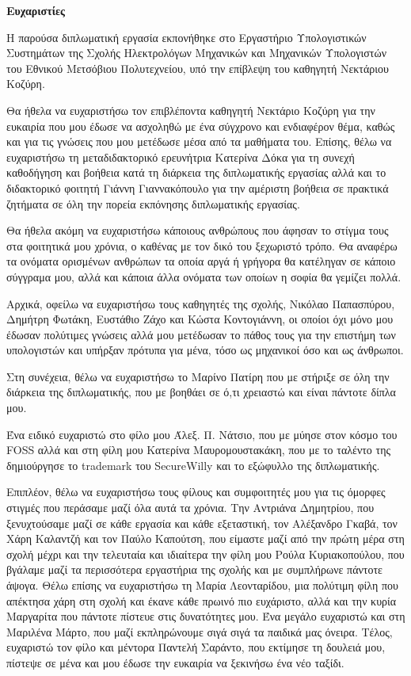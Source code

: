 \thispagestyle{empty}
\gr{}
\begingroup
 
\begin{mdseries}
\hfill\break 
\textbf{\Large Ευχαριστίες}
\hfill\break

Η παρούσα διπλωματική εργασία εκπονήθηκε στο Εργαστήριο Υπολογιστικών Συστημάτων της Σχολής Ηλεκτρολόγων Μηχανικών και Μηχανικών Υπολογιστών του Εθνικού Μετσόβιου Πολυτεχνείου, υπό την επίβλεψη του καθηγητή Νεκτάριου Κοζύρη.

Θα ήθελα να ευχαριστήσω τον επιβλέποντα καθηγητή Νεκτάριο Κοζύρη για την ευκαιρία που μου έδωσε να ασχοληθώ με ένα σύγχρονο και ενδιαφέρον θέμα, καθώς και για τις γνώσεις που μου μετέδωσε μέσα από τα μαθήματα του. Επίσης, θέλω να ευχαριστήσω τη μεταδιδακτορικό ερευνήτρια Κατερίνα Δόκα για τη συνεχή καθοδήγηση και βοήθεια κατά τη διάρκεια της διπλωματικής εργασίας αλλά και το διδακτορικό φοιτητή Γιάννη Γιαννακόπουλο για την αμέριστη βοήθεια σε πρακτικά ζητήματα σε όλη την πορεία εκπόνησης διπλωματικής εργασίας.

Θα ήθελα ακόμη να ευχαριστήσω κάποιους ανθρώπους που άφησαν το στίγμα τους στα φοιτητικά μου χρόνια, ο καθένας με τον δικό του ξεχωριστό τρόπο. Θα αναφέρω τα ονόματα ορισμένων ανθρώπων τα οποία αργά ή γρήγορα θα κατέληγαν σε κάποιο σύγγραμα μου, αλλά και κάποια άλλα ονόματα των οποίων η σοφία θα γεμίζει πολλά.

Αρχικά, οφείλω να ευχαριστήσω τους καθηγητές της σχολής, Νικόλαο Παπασπύρου, Δημήτρη Φωτάκη, Ευστάθιο Ζάχο και Κώστα Κοντογιάννη, οι οποίοι όχι μόνο μου έδωσαν πολύτιμες γνώσεις αλλά μου μετέδωσαν το πάθος τους για την επιστήμη των υπολογιστών και υπήρξαν πρότυπα για μένα, τόσο ως μηχανικοί όσο και ως άνθρωποι.

Στη συνέχεια, θέλω να ευχαριστήσω το Μαρίνο Πατίρη που με στήριξε σε όλη την διάρκεια της διπλωματικής, που με βοηθάει σε ό,τι χρειαστώ και είναι πάντοτε δίπλα μου.

Ένα ειδικό ευχαριστώ στο φίλο μου Άλεξ. Π. Νάτσιο, που με μύησε στον κόσμο του \en FOSS\gr{} αλλά και στη φίλη μου Κατερίνα Μαυρομουστακάκη, που με το ταλέντο της δημιούργησε το \en trademark\gr{} του \en SecureWilly\gr{} και το εξώφυλλο της διπλωματικής.

Επιπλέον, θέλω να ευχαριστήσω τους φίλους και συμφοιτητές μου για τις όμορφες στιγμές που περάσαμε μαζί όλα αυτά τα χρόνια. Την Αντριάνα Δημητρίου, που ξενυχτούσαμε μαζί σε κάθε εργασία και κάθε εξεταστική, τον Αλέξανδρο Γκαβά, τον Χάρη Καλαντζή και τον Παύλο Καπούτση, που είμαστε μαζί από την πρώτη μέρα στη σχολή μέχρι και την τελευταία και ιδιαίτερα την φίλη μου Ρούλα Κυριακοπούλου, που βγάλαμε μαζί τα περισσότερα εργαστήρια της σχολής και με συμπλήρωνε πάντοτε άψογα. Θέλω επίσης να ευχαριστήσω τη Μαρία Λεονταρίδου, μια πολύτιμη φίλη που απέκτησα χάρη στη σχολή και έκανε κάθε πρωινό πιο ευχάριστο, αλλά και την κυρία Μαργαρίτα που πάντοτε πίστευε στις δυνατότητες μου. Ένα μεγάλο ευχαριστώ και στη Μαριλένα Μάρτο, που μαζί εκπληρώνουμε σιγά σιγά τα παιδικά μας όνειρα. Τέλος, ευχαριστώ τον φίλο και μέντορα Παντελή Σαράντο, που εκτίμησε τη δουλειά μου, πίστεψε σε μένα και μου έδωσε την ευκαιρία να ξεκινήσω ένα νέο ταξίδι.


\end{mdseries}
